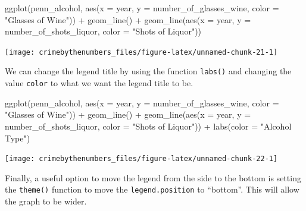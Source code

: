 \documentclass[
  12pt,
  openany]{book}
\newenvironment{Shaded}{\begin{snugshade}}{\end{snugshade}}
\newcommand{\AttributeTok}[1]{\textcolor[rgb]{0.61,0.61,0.61}{#1}}
\newcommand{\FunctionTok}[1]{\textcolor[rgb]{0,0,0}{#1}}
\newcommand{\NormalTok}[1]{#1}
\newcommand{\SpecialCharTok}[1]{\textcolor[rgb]{0,0,0}{#1}}
\newcommand{\StringTok}[1]{\textcolor[rgb]{0.5,0.5,0.5}{#1}}
\begin{document}
\begin{Shaded}
\begin{Highlighting}[]
\FunctionTok{ggplot}\NormalTok{(penn\_alcohol, }\FunctionTok{aes}\NormalTok{(}\AttributeTok{x =}\NormalTok{ year, }\AttributeTok{y =}\NormalTok{ number\_of\_glasses\_wine,}
                         \AttributeTok{color =} \StringTok{"Glasses of Wine"}\NormalTok{)) }\SpecialCharTok{+}
  \FunctionTok{geom\_line}\NormalTok{() }\SpecialCharTok{+}
  \FunctionTok{geom\_line}\NormalTok{(}\FunctionTok{aes}\NormalTok{(}\AttributeTok{x =}\NormalTok{ year, }\AttributeTok{y =}\NormalTok{ number\_of\_shots\_liquor,}
                \AttributeTok{color =} \StringTok{"Shots of Liquor"}\NormalTok{))}
\end{Highlighting}
\end{Shaded}

\begin{center}\texttt{[image: crimebythenumbers\_files/figure-latex/unnamed-chunk-21-1]} \end{center}

We can change the legend title by using the function \texttt{labs()} and changing the value \texttt{color} to what we want the legend title to be.

\begin{Shaded}
\begin{Highlighting}[]
\FunctionTok{ggplot}\NormalTok{(penn\_alcohol, }\FunctionTok{aes}\NormalTok{(}\AttributeTok{x =}\NormalTok{ year, }\AttributeTok{y =}\NormalTok{ number\_of\_glasses\_wine,}
                         \AttributeTok{color =} \StringTok{"Glasses of Wine"}\NormalTok{)) }\SpecialCharTok{+}
  \FunctionTok{geom\_line}\NormalTok{() }\SpecialCharTok{+}
  \FunctionTok{geom\_line}\NormalTok{(}\FunctionTok{aes}\NormalTok{(}\AttributeTok{x =}\NormalTok{ year, }\AttributeTok{y =}\NormalTok{ number\_of\_shots\_liquor,}
                \AttributeTok{color =} \StringTok{"Shots of Liquor"}\NormalTok{)) }\SpecialCharTok{+}
  \FunctionTok{labs}\NormalTok{(}\AttributeTok{color =} \StringTok{"Alcohol Type"}\NormalTok{)}
\end{Highlighting}
\end{Shaded}

\begin{center}\texttt{[image: crimebythenumbers\_files/figure-latex/unnamed-chunk-22-1]} \end{center}

Finally, a useful option to move the legend from the side to the bottom is setting the \texttt{theme()} function to move the \texttt{legend.position} to ``bottom''. This will allow the graph to be wider.
\end{document}
